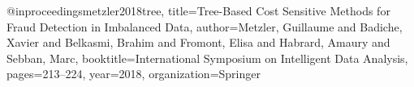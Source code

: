 @inproceedings{metzler2018tree,
  title={Tree-Based Cost Sensitive Methods for Fraud Detection in Imbalanced Data},
  author={Metzler, Guillaume and Badiche, Xavier and Belkasmi, Brahim and Fromont, Elisa and Habrard, Amaury and Sebban, Marc},
  booktitle={International Symposium on Intelligent Data Analysis},
  pages={213--224},
  year={2018},
  organization={Springer}
}